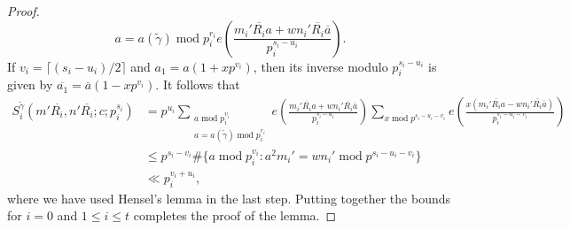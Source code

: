 \documentclass[10pt,a4paper]{amsart}
\DeclareMathOperator{\modulo}{mod}
\begin{document}
\begin{proof}
\begin{equation*}
{{    a = a(\widetilde{\gamma}) \modulo p_i^{r_i}}} e\left(\frac{m_i' \overline{R_i} a + wn_i' \overline{R_i} \overline{a}}{p_i^{s_i - u_i}}\right).
\end{equation*}
If $v_i = \lceil (s_i - u_i)/2\rceil$ and $a_1 = a(1 + xp^{v_i})$, then its inverse modulo $p_i^{s_i - u_i}$ is given by $\overline{a_1} = \overline{a}(1 - xp^{v_i})$. It follows that 
\begin{equation}
\begin{aligned}
    S^{\tilde{\gamma}}_i(m'\overline{R_i}, n' \overline{R_i}; c; p_i^{s_i}) & = p^{u_i} \sum_{\substack{a \modulo p_i^{v_i}\\
    a = a(\widetilde{\gamma}) \modulo p_i^{r_i}}} e\left(\frac{m_i' \overline{R_i} a + wn_i' \overline{R_i} \overline{a}}{p_i^{s_i - u_i}}\right)\sum_{x \modulo p^{s_i - u_i - v_i}} e\left(\frac{x(m_i'\overline{R_i}a - wn_i'\overline{R_i}\overline{a})}{p_i^{s_i - u_i - v_i}}\right)\\
    & \leq p^{s_i - v_i} \#\{a \modulo p_i^{v_i} : a^2 m_i' = wn_i' \modulo p^{s_i - u_i - v_i}\}\\
    & \ll p_i^{v_i + u_i},
\end{aligned}
\end{equation}
where we have used Hensel's lemma in the last step. Putting together the bounds for $i = 0$ and $1 \leq i \leq t$ completes the proof of the lemma.
\end{proof}
\end{document}
